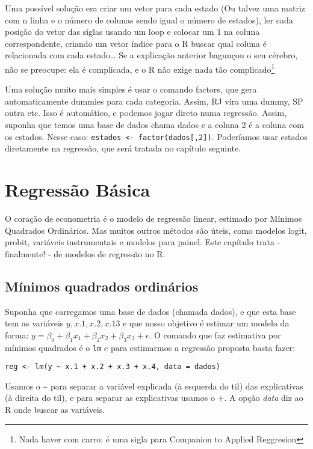 \documentclass[]{book}
\let\rmarkdownfootnote\footnote%
\def\footnote{\protect\rmarkdownfootnote}
\begin{document}
Uma possível solução era criar um vetor para cada estado (Ou talvez uma
matriz com n linha e o número de colunas sendo igual o número de
estados), ler cada posição do vetor das siglas usando um loop e colocar
um 1 na coluna correspondente, criando um vetor índice para o R buscar
qual coluna é relacionada com cada estado\ldots{} Se a explicação
anterior bagunçou o seu cérebro, não se preocupe: ela é complicada, e o
R não exige nada tão complicado\footnote{Nada haver com carro: é uma
  sigla para Companion to Applied Reggresion}

Uma solução muito mais simples é usar o comando factors, que gera
automaticamente dummies para cada categoria. Assim, RJ vira uma dummy,
SP outra etc. Isso é automático, e podemos jogar direto numa regressão.
Assim, suponha que temos uma base de dados chama dados e a coluna 2 é a
coluna com os estados. Nesse caso:
\texttt{estados\ \textless{}-\ factor(dados{[},2{]})}. Poderíamos usar
estados diretamente na regressão, que será tratada no capítulo seguinte.

\chapter{Regressão Básica}\label{regressao-basica}

O coração de econometria é o modelo de regressão linear, estimado por
Mínimos Quadrados Ordinários. Mas muitos outros métodos são úteis, como
modelos logit, probit, variáveis instrumentais e modelos para painel.
Este capítulo trata - finalmente! - de modelos de regressão no R.

\section{Mínimos quadrados
ordinários}\label{minimos-quadrados-ordinarios}

Suponha que carregamos uma base de dados (chamada dados), e que esta
base tem as variáveis \(y, x.1,x.2,x.13\) e que nosso objetivo é estimar
um modelo da forma:
\(y = \beta_0 + \beta_1 x_1 + \beta_2 x_2 + \beta_3 x_3 + \epsilon\). O
comando que faz estimativa por mínimos quadrados é o \texttt{lm} e para
estimarmos a regressão proposta basta fazer:

\begin{verbatim}
reg <- lm(y ~ x.1 + x.2 + x.3 + x.4, data = dados)
\end{verbatim}

Usamos o \textasciitilde{} para separar a variável explicada (à esquerda
do til) das explicativas (à direita do til), e para separar as
explicativas usamos o +. A opção \emph{data} diz ao R onde buscar as
variáveis.
\end{document}
